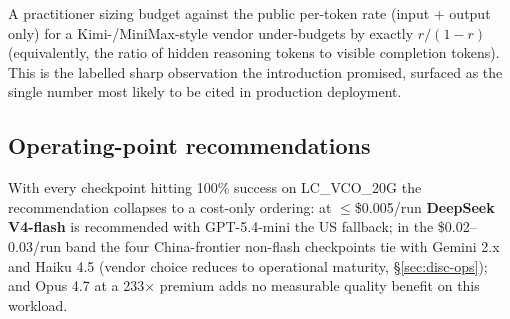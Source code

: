A practitioner sizing budget against the public per-token rate
(input + output only) for a Kimi-/MiniMax-style vendor under-budgets
by exactly $r/(1-r)$ (equivalently, the ratio of hidden reasoning
tokens to visible completion tokens). This is the labelled sharp
observation the
introduction promised, surfaced as the single number most likely to
be cited in production deployment.

\subsection{Operating-point recommendations}
\label{sec:results-ops}

With every checkpoint hitting 100\% success on LC\_VCO\_20G the
recommendation collapses to a cost-only ordering: at $\leq$\$0.005/run
\textbf{DeepSeek V4-flash} is recommended with GPT-5.4-mini the
US fallback; in the \$0.02--0.03/run band the four China-frontier
non-flash checkpoints tie with Gemini 2.x and Haiku 4.5 (vendor
choice reduces to operational maturity, \S\ref{sec:disc-ops}); and
Opus 4.7 at a 233$\times$ premium adds no measurable quality
benefit on this workload.
